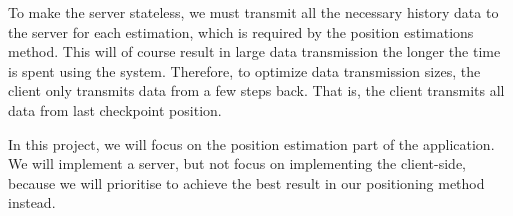 To make the server stateless, we must transmit all the necessary history data to the server for each estimation, which is required by the position estimations method. This will of course result in large data transmission the longer the time is spent using the system. Therefore, to optimize data transmission sizes, the client only transmits data from a few steps back. That is, the client transmits all data from last checkpoint position.

In this project, we will focus on the position estimation part of the application. We will implement a server, but not focus on implementing the client-side, because we will prioritise to achieve the best result in our positioning method instead.